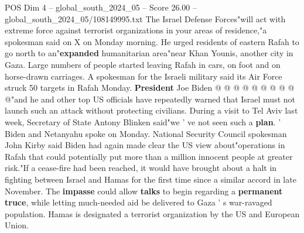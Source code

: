 \begin{textsample}{POS Dim 4 – global\_south\_2024\_05 – Score 26.00 – global\_south\_2024\_05/108149995.txt}
The Israel Defense Forces"will act with extreme force against terrorist organizations in your areas of residence,"a spokesman said on X on Monday morning.
He urged residents of eastern Rafah to go north to an"\textbf{expanded} humanitarian area"near Khan Younis, another city in Gaza.
Large numbers of people started leaving Rafah in cars, on foot and on horse-drawn carriages.
A spokesman for the Israeli military said its Air Force struck 50 targets in Rafah Monday. \textbf{President} Joe Biden @ @ @ @ @ @ @ @ @ @"and he and other top US officials have repeatedly warned that Israel must not launch such an attack without protecting civilians.
During a visit to Tel Aviv last week, Secretary of State Antony Blinken said"we ' ve not seen such a \textbf{plan}. ' Biden and Netanyahu spoke on Monday.
National Security Council spokesman John Kirby said Biden had again made clear the US view about"operations in Rafah that could potentially put more than a million innocent people at greater risk."If a cease-fire had been reached, it would have brought about a halt in fighting between Israel and Hamas for the first time since a similar accord in late November.
The \textbf{impasse} could allow \textbf{talks} to begin regarding a \textbf{permanent} \textbf{truce}, while letting much-needed aid be delivered to Gaza ' s war-ravaged population.
Hamas is designated a terrorist organization by the US and European Union.

\end{textsample}
